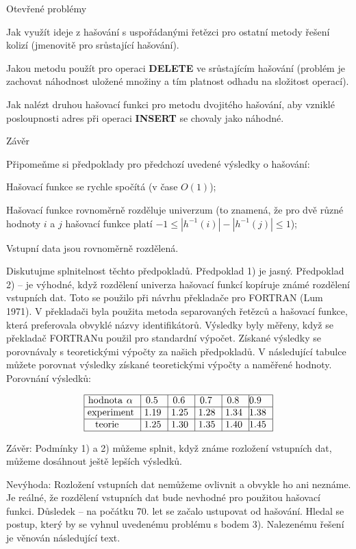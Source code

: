 \documentclass[a4paper,12pt]{article}
\begin{document}
\subhead
Otevřené problémy
\endsubhead

Jak využít ideje z hašování s uspořádanými 
řetězci pro ostatní metody řešení kolizí 
(jmeno\-vitě pro srůstající hašování).

Jakou metodu použít pro operaci {\bf DELETE} ve 
srůstajícím hašování (problém je zachovat náhodnost 
uložené množiny a tím platnost odhadu na složitost operací). 

Jak nalézt druhou hašovací funkci pro metodu 
dvojitého hašo\-vá\-ní, aby vzniklé posloupnosti adres při operaci 
{\bf INSERT} se chovaly jako náhodné.

\subhead
Závěr
\endsubhead

Připomeňme si předpoklady pro předchozí uvedené 
výsledky o hašování:
\roster
\item
Hašovací funkce se rychle spočítá (v čase 
$O(1)$);
\item Hašovací funkce rovnoměrně rozděluje univerzum (to 
znamená, že pro dvě různé hodnoty $i$ a $j$ 
hašovací funkce platí $-1\le |h^{-1}(i)|-|h^{-1}(j)|\le 
1$); 
\item
Vstupní data jsou rovnoměrně rozdělená.
\endroster

Diskutujme splnitelnost těchto předpokladů.\newline 
Předpoklad 1) je jasný.\newline 
Předpoklad 2) -- je výhodné, 
když rozdělení univerza hašovací funkcí kopíruje známé 
rozděle\-ní vstupních dat. Toto se použilo při návrhu 
překladače pro FORTRAN (Lum 1971). V překladači byla použita metoda separovaných řetězců a hašovací funkce, 
která preferovala obvyklé názvy identifikátorů. Výsledky byly měřeny, když se překladač FORTRANu použil pro standardní výpočet. Získané výsledky se porovnávaly s teoretickými výpočty za našich předpokladů. V 
následující tabulce můžete porovnat výsledky 
získané teoretickými výpočty a naměřené hodnoty.
Porovnání výsledků:

$$\vtop{\offinterlineskip\halign {\strut\vrule\ # & \vrule\ # & \vrule\ # & \vrule\ # & \vrule\ # & \vrule \hfil # \hfil \vrule\cr\noalign{\hrule}hodnota $\alpha$ & 0.5 & 0.6 & 0.7 & 0.8 & 0.9 \hfill \cr\noalign{\hrule}experiment & 1.19 & 1.25 & 1.28 & 1.34 & 1.38 \cr\noalign{\hrule}teorie & 1.25 & 1.30 & 1.35 & 1.40 & 1.45 \cr\noalign{\hrule}}}$$

Závěr: Podmínky 1) a 2) můžeme splnit, 
když známe rozložení vstupních dat, můžeme 
dosáhnout ještě lepších výsledků.

Nevýhoda: Rozložení vstupních dat 
nemůžeme ovlivnit a obvykle ho ani neznáme. Je 
reálné, že rozdělení vstupních dat bude nevhodné pro 
použitou hašovací funkci. Důsledek -- na počátku 
70. let se začalo ustupovat od hašování. Hledal se postup, 
který by se vyhnul uvedenému problému s bodem 3). Nalezenému 
řešení je věnován následující text.
\end{document}
